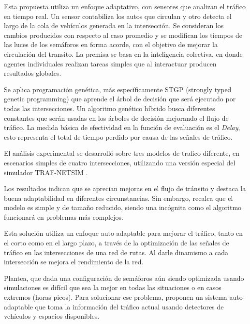 \begin{itemize}
\begin{item}
Esta propuesta utiliza un enfoque adaptativo, con sensores que analizan el tráfico en tiempo real. Un sensor contabiliza los autos que circulan y otro detecta el largo de la cola de vehículos generada en la intersección. Se consideran los cambios producidos con respecto al caso promedio y se modifican los tiempos de las luces de los semáforos en forma acorde, con el objetivo de mejorar la circulación del transito. La premisa se basa en la inteligencia colectiva, en donde agentes individuales realizan tareas simples que al interactuar producen resultados globales.

Se aplica programación genética, más específicamente STGP (strongly typed genetic programming) \citep{Montana1995} que aprende el árbol de decisión que será ejecutado por todas las intersecciones. Un algoritmo genético híbrido busca diferentes constantes que serán usadas en los árboles de decisión mejorando el flujo de tráfico. La medida básica de efectividad en la función de evaluación es el \emph{Delay}, esto representa el total de tiempo perdido por causa de las señales de tráfico. 

El análisis experimental se desarrolló sobre tres modelos de trafico diferente, en escenarios simples de cuatro intersecciones, utilizando una versión especial del simulador TRAF-NETSIM \citep{TRAF-NETSIM}.

Los resultados indican que se aprecian mejoras en el flujo de tránsito y destaca la buena adaptabilidad en diferentes circunstancias. Sin embargo, recalca que el modelo es simple y de tamaño reducido, siendo una incógnita como el algoritmo funcionará en problemas más complejos.

\end{item}	


\begin{item}

Esta solución utiliza un enfoque auto-adaptable para mejorar el tráfico, tanto en el corto como en el largo plazo, a través de la optimización de las señales de tráfico en las intersecciones de una red de rutas. Al darle dinamismo a cada intersección se mejora el rendimiento de la red.

Plantea, que dada una configuración de semáforos aún siendo optimizada usando simulaciones es difícil que sea la mejor en todas las situaciones o en casos extremos (horas picos). Para solucionar ese problema, proponen un sistema auto-adaptable que toma la información del tráfico actual usando detectores de vehículos y espacios disponibles.


\end{item}
\end{itemize}
